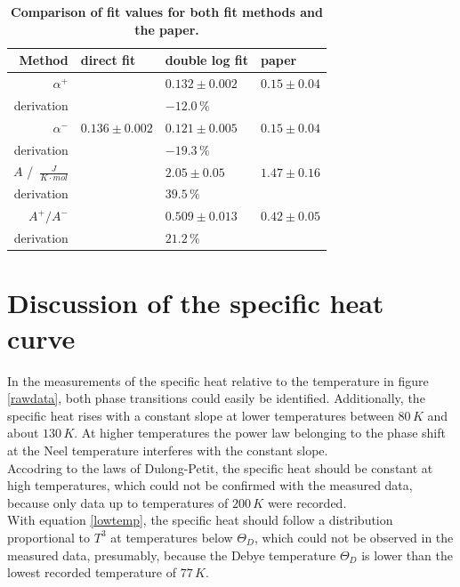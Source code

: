 \documentclass{include/thesisclass3}
\newcommand{\cc}{\cdot}
\newcommand{\e}[1]{\,\si{#1}}
\begin{document}
\begin{table}[H]
\centering
\caption{\label{neeltable}\textbf{Comparison of fit values for both fit methods and the paper.}}
\begin{tabular}{r|lll}

\toprule
Method & direct fit & double log fit & paper \\
\midrule
$\alpha^+$ 						&						&	$0.132 \pm 0.002$&	$0.15\pm 0.04$	\\		
derivation						&						&	$-12.0\e{\%}$		&\\
\midrule
$\alpha^-$ 						&	$0.136 \pm 0.002$	&	$0.121 \pm 0.005$&	$0.15\pm 0.04$	\\
derivation 						&						&	$-19.3\e{\%}$	&\\
\midrule
$A$ / $\e{\frac{J}{K \cc mol}}$ 	&						&	$2.05 \pm 0.05$	&	$1.47\pm 0.16$	\\
derivation 						&						&	$39.5\e{\%}$		&\\
\midrule
$A^+/A^-$ 						&						&	$0.509 \pm 0.013$&	$0.42\pm 0.05$	\\
derivation						&						&	$21.2\e{\%}$		&\\
\midrule
\end{tabular}
\end{table}

\section{Discussion of the specific heat curve}
In the measurements of the specific heat relative to the temperature in figure \ref{rawdata}, both phase transitions could easily be identified. 
Additionally, the specific heat rises with a constant slope at lower temperatures between $80\e{K}$ and about $130\e{K}$. 
At higher temperatures the power law belonging to the phase shift at the Neel temperature interferes with the constant slope.\\
Accodring to the laws of Dulong-Petit, the specific heat should be constant at high temperatures, which could not be confirmed with the measured data, because only data up to temperatures of $200\e{K}$ were recorded.\\
With equation \ref{lowtemp}, the specific heat should follow a distribution proportional to $T^3$ at temperatures below $\Theta_D$, which could not be observed in the measured data, presumably, because the Debye temperature $\Theta_D$ is lower than the lowest recorded temperature of $77\e{K}$.
\end{document}
